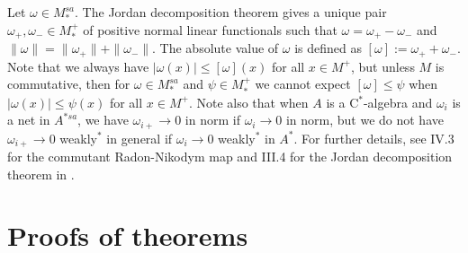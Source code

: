 \documentclass[noamsfonts,a4paper,10pt]{amsart}
\theoremstyle{plain}
\theoremstyle{definition}
\begin{document}
Let $\omega\in M_*^{sa}$.
The Jordan decomposition theorem gives a unique pair $\omega_+,\omega_-\in M_*^+$ of positive normal linear functionals such that $\omega=\omega_+-\omega_-$ and $\|\omega\|=\|\omega_+\|+\|\omega_-\|$.
The absolute value of $\omega$ is defined as $[\omega]:=\omega_++\omega_-$.
Note that we always have $|\omega(x)|\le[\omega](x)$ for all $x\in M^+$, but unless $M$ is commutative, then for $\omega\in M_*^{sa}$ and $\psi\in M_*^+$ we cannot expect $[\omega]\le\psi$ when $|\omega(x)|\le\psi(x)$ for all $x\in M^+$.
Note also that when $A$ is a C$^*$-algebra and $\omega_i$ is a net in $A^{*sa}$, we have $\omega_{i+}\to0$ in norm if $\omega_i\to0$ in norm, but we do not have $\omega_{i+}\to0$ weakly$^*$ in general if $\omega_i\to0$ weakly$^*$ in $A^*$.
For further details, see IV.3 for the commutant Radon-Nikodym map and III.4 for the Jordan decomposition theorem in \cite{MR1873025}.



\section{Proofs of theorems}
\end{document}
